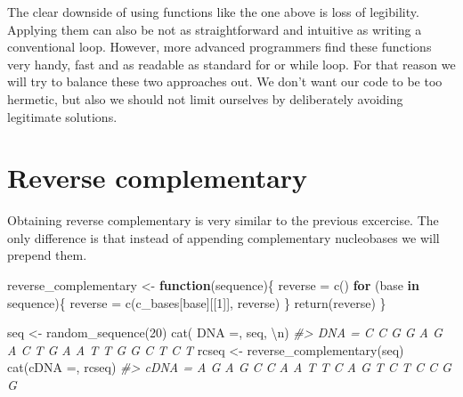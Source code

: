 \documentclass[
]{book}
\newenvironment{Shaded}{\begin{snugshade}}{\end{snugshade}}
\newcommand{\CommentTok}[1]{\textcolor[rgb]{0.56,0.35,0.01}{\textit{#1}}}
\newcommand{\ControlFlowTok}[1]{\textcolor[rgb]{0.13,0.29,0.53}{\textbf{#1}}}
\newcommand{\DecValTok}[1]{\textcolor[rgb]{0.00,0.00,0.81}{#1}}
\newcommand{\FunctionTok}[1]{\textcolor[rgb]{0.00,0.00,0.00}{#1}}
\newcommand{\NormalTok}[1]{#1}
\newcommand{\OtherTok}[1]{\textcolor[rgb]{0.56,0.35,0.01}{#1}}
\newcommand{\SpecialCharTok}[1]{\textcolor[rgb]{0.00,0.00,0.00}{#1}}
\newcommand{\StringTok}[1]{\textcolor[rgb]{0.31,0.60,0.02}{#1}}
\begin{document}
The clear downside of using functions like the one above is loss of legibility. Applying them can also be not as straightforward and intuitive as writing a conventional loop. However, more advanced programmers find these functions very handy, fast and as readable as standard for or while loop. For that reason we will try to balance these two approaches out. We don't want our code to be too hermetic, but also we should not limit ourselves by deliberately avoiding legitimate solutions.

\hypertarget{reverse-complementary}{%
\section{Reverse complementary}\label{reverse-complementary}}

Obtaining reverse complementary is very similar to the previous excercise. The only difference is that instead of appending complementary nucleobases we will prepend them.

\begin{Shaded}
\begin{Highlighting}[]
\NormalTok{reverse\_complementary }\OtherTok{\textless{}{-}} \ControlFlowTok{function}\NormalTok{(sequence)\{}
\NormalTok{  reverse }\OtherTok{=} \FunctionTok{c}\NormalTok{()}
  \ControlFlowTok{for}\NormalTok{ (base }\ControlFlowTok{in}\NormalTok{ sequence)\{}
\NormalTok{    reverse }\OtherTok{=} \FunctionTok{c}\NormalTok{(c\_bases[base][[}\DecValTok{1}\NormalTok{]], reverse)}
\NormalTok{  \}}
  \FunctionTok{return}\NormalTok{(reverse)}
\NormalTok{\}}
\end{Highlighting}
\end{Shaded}

\begin{Shaded}
\begin{Highlighting}[]
\NormalTok{seq }\OtherTok{\textless{}{-}} \FunctionTok{random\_sequence}\NormalTok{(}\DecValTok{20}\NormalTok{)}
\FunctionTok{cat}\NormalTok{(}\StringTok{\textquotesingle{} DNA =\textquotesingle{}}\NormalTok{, seq, }\StringTok{\textquotesingle{}}\SpecialCharTok{\textbackslash{}n}\StringTok{\textquotesingle{}}\NormalTok{)}
\CommentTok{\#\textgreater{}  DNA = C C G G A G A C T G A A T T G G C T C T}
\NormalTok{rcseq }\OtherTok{\textless{}{-}} \FunctionTok{reverse\_complementary}\NormalTok{(seq)}
\FunctionTok{cat}\NormalTok{(}\StringTok{\textquotesingle{}cDNA =\textquotesingle{}}\NormalTok{, rcseq)}
\CommentTok{\#\textgreater{} cDNA = A G A G C C A A T T C A G T C T C C G G}
\end{Highlighting}
\end{Shaded}
\end{document}
